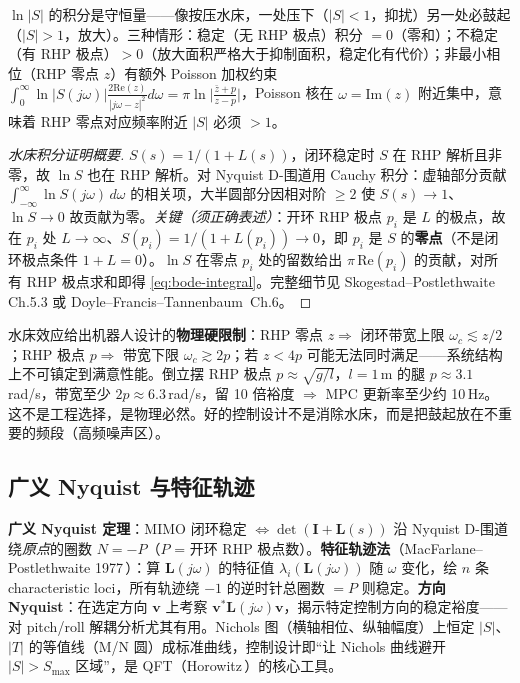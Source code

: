$\ln|S|$ 的积分是守恒量——像按压水床，一处压下（$|S|<1$，抑扰）另一处必鼓起（$|S|>1$，放大）。三种情形：稳定（无 RHP 极点）积分 $=0$（零和）；不稳定（有 RHP 极点）$>0$（放大面积严格大于抑制面积，稳定化有代价）；非最小相位（RHP 零点 $z$）有额外 Poisson 加权约束 $\int_0^\infty\ln|S(j\omega)|\tfrac{2\mathrm{Re}(z)}{|j\omega-z|^2}d\omega=\pi\ln\big|\tfrac{\bar z+p}{z-p}\big|$，Poisson 核在 $\omega=\mathrm{Im}(z)$ 附近集中，意味着 RHP 零点对应频率附近 $|S|$ 必须 $>1$。

\begin{proof}[水床积分证明概要]
$S(s)=1/(1+L(s))$，闭环稳定时 $S$ 在 RHP 解析且非零，故 $\ln S$ 也在 RHP 解析。对 Nyquist D-围道用 Cauchy 积分：虚轴部分贡献 $\int_{-\infty}^\infty\ln S(j\omega)\,d\omega$ 的相关项，大半圆部分因相对阶 $\ge2$ 使 $S(s)\to1$、$\ln S\to0$ 故贡献为零。\emph{关键（须正确表述）}：开环 RHP 极点 $p_i$ 是 $L$ 的极点，故在 $p_i$ 处 $L\to\infty$、$S(p_i)=1/(1+L(p_i))\to0$，即 $p_i$ 是 $S$ 的\textbf{零点}（不是闭环极点条件 $1+L=0$）。$\ln S$ 在零点 $p_i$ 处的留数给出 $\pi\,\mathrm{Re}(p_i)$ 的贡献，对所有 RHP 极点求和即得 \cref{eq:bode-integral}。完整细节见 Skogestad--Postlethwaite\,\cite{skogestad2005multivariable} Ch.5.3 或 Doyle--Francis--Tannenbaum\,\cite{doyle1990feedback} Ch.6。
\end{proof}

\begin{insight}
水床效应给出机器人设计的\textbf{物理硬限制}：RHP 零点 $z\Rightarrow$ 闭环带宽上限 $\omega_c\lesssim z/2$；RHP 极点 $p\Rightarrow$ 带宽下限 $\omega_c\gtrsim2p$；若 $z<4p$ 可能无法同时满足——系统结构上不可镇定到满意性能。倒立摆 RHP 极点 $p\approx\sqrt{g/l}$，$l=1\,$m 的腿 $p\approx3.1\,$rad/s，带宽至少 $2p\approx6.3\,$rad/s，留 10 倍裕度 $\Rightarrow$ MPC 更新率至少约 10\,Hz。这不是工程选择，是物理必然。好的控制设计不是消除水床，而是把鼓起放在不重要的频段（高频噪声区）。
\end{insight}

\subsection{广义 Nyquist 与特征轨迹}
\textbf{广义 Nyquist 定理}：MIMO 闭环稳定 $\iff\det(\mathbf I+\mathbf L(s))$ 沿 Nyquist D-围道绕\emph{原点}的圈数 $N=-P$（$P$ = 开环 RHP 极点数）。\textbf{特征轨迹法}（MacFarlane--Postlethwaite 1977\,\cite{macfarlane1977characteristic}）：算 $\mathbf L(j\omega)$ 的特征值 $\lambda_i(\mathbf L(j\omega))$ 随 $\omega$ 变化，绘 $n$ 条 characteristic loci，所有轨迹绕 $-1$ 的逆时针总圈数 $=P$ 则稳定。\textbf{方向 Nyquist}：在选定方向 $\mathbf v$ 上考察 $\mathbf v^*\mathbf L(j\omega)\mathbf v$，揭示特定控制方向的稳定裕度——对 pitch/roll 解耦分析尤其有用。Nichols 图（横轴相位、纵轴幅度）上恒定 $|S|$、$|T|$ 的等值线（M/N 圆）成标准曲线，控制设计即“让 Nichols 曲线避开 $|S|>S_{\max}$ 区域”，是 QFT（Horowitz\,\cite{horowitz1963qft}）的核心工具。

